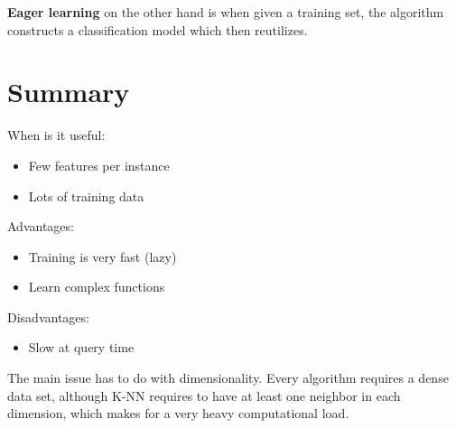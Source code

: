 \textbf{Eager learning} on the other hand is when given a training set, the algorithm constructs a classification model which then reutilizes. 

\section{Summary}
When is it useful:
\begin{itemize}
	\item Few features per instance
	\item Lots of training data
\end{itemize}

Advantages:

\begin{itemize}
	\item Training is very fast (lazy)
	\item Learn complex functions
\end{itemize}

Disadvantages:

\begin{itemize}
	\item Slow at query time
\end{itemize}





The main issue has to do with dimensionality. Every algorithm requires a dense data set, although K-NN requires to have at least one neighbor in each dimension, which makes for a very heavy computational load.